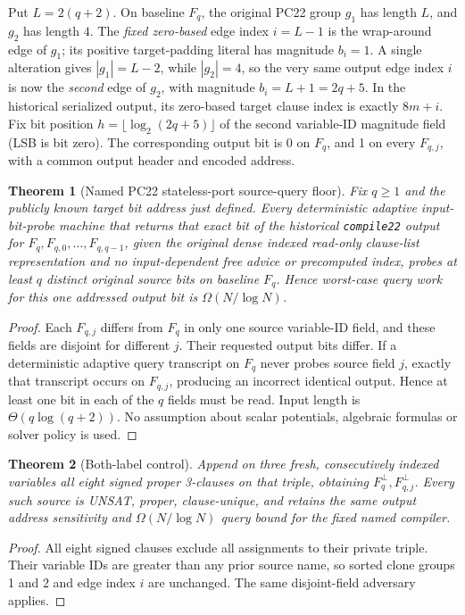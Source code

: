 \documentclass[11pt]{article}
\newtheorem{theorem}{Theorem}
\begin{document}
Put \(L=2(q+2)\). On baseline \(F_q\), the original PC22 group \(g_1\) has length \(L\), and \(g_2\) has length \(4\). The \emph{fixed zero-based} edge index \(i=L-1\) is the wrap-around edge of \(g_1\); its positive target-padding literal has magnitude \(b_i=1\). A single alteration gives \(|g_1|=L-2\), while \(|g_2|=4\), so the very same output edge index \(i\) is now the \emph{second} edge of \(g_2\), with magnitude \(b_i=L+1=2q+5\). In the historical serialized output, its zero-based target clause index is exactly \(8m+i\). Fix bit position \(h=\lfloor\log_2(2q+5)\rfloor\) of the second variable-ID magnitude field (LSB is bit zero). The corresponding output bit is 0 on \(F_q\), and 1 on every \(F_{q,j}\), with a common output header and encoded address.
\begin{theorem}[Named PC22 stateless-port source-query floor]
Fix \(q\ge1\) and the publicly known target bit address just defined. Every deterministic adaptive input-\emph{bit}-probe machine that returns that exact bit of the historical \texttt{compile22} output for \(F_q,F_{q,0},\ldots,F_{q,q-1}\), given the original dense indexed read-only clause-list representation and no input-dependent free advice or precomputed index, probes at least \(q\) distinct original source bits on baseline \(F_q\). Hence worst-case query work for this one addressed output bit is \(\Omega(N/\log N)\).
\end{theorem}
\begin{proof}
Each \(F_{q,j}\) differs from \(F_q\) in only one source variable-ID field, and these fields are disjoint for different \(j\). Their requested output bits differ. If a deterministic adaptive query transcript on \(F_q\) never probes source field \(j\), exactly that transcript occurs on \(F_{q,j}\), producing an incorrect identical output. Hence at least one bit in each of the \(q\) fields must be read. Input length is \(\Theta(q\log(q+2))\). No assumption about scalar potentials, algebraic formulas or solver policy is used.
\end{proof}
\begin{theorem}[Both-label control]
Append on three fresh, consecutively indexed variables all eight signed proper 3-clauses on that triple, obtaining \(F_q^\bot,F_{q,j}^\bot\). Every such source is UNSAT, proper, clause-unique, and retains the same output address sensitivity and \(\Omega(N/\log N)\) query bound for the fixed named compiler.
\end{theorem}
\begin{proof}
All eight signed clauses exclude all assignments to their private triple. Their variable IDs are greater than any prior source name, so sorted clone groups 1 and 2 and edge index \(i\) are unchanged. The same disjoint-field adversary applies.
\end{proof}
\end{document}
